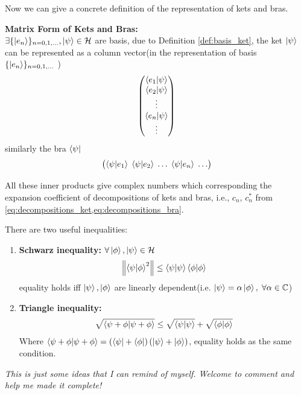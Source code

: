 Now we can give a concrete definition of the representation of kets and bras.
\begin{definition}{\textbf{Matrix Form of Kets and Bras:}}\label{def:matrix_ketandbra}
    \\ 
    $\exists \{\ket{e_n} \}_{n=0,1,\dots},\ket{\psi} \in \mathcal{H} $ are basis, due to Definition \ref{def:basis_ket}, the ket $\ket{\psi}$ can be represented as a column vector(in the representation of basis $\{\ket{e_n}\}_{n=0,1,\dots}$ )
    \begin{eqnarray}
        \begin{pmatrix}
            \braket{e_1|\psi} \\
            \braket{e_2|\psi} \\
            \vdots \\
            \braket{e_n|\psi} \\
            \vdots
        \end{pmatrix}
    \end{eqnarray}
    similarly the bra $\bra{\psi}$
    \begin{eqnarray}
        \begin{pmatrix}
            \braket{\psi|e_1}\;\braket{\psi|e_2}\;\dots\;\braket{\psi|e_n}\;\dots
        \end{pmatrix} \label{eq:row_bra}
    \end{eqnarray}
\end{definition}
All these inner products give complex numbers which corresponding the expansion coefficient of decompositions of kets and bras, i.e., $c_n,\,c_n^*$ from \cref{eq:decompositions_ket,eq:decompositions_bra}.

There are two useful inequalities: 
\begin{tcolorbox}
    \begin{enumerate}
        \item \textbf{Schwarz inequality:} $\forall \ket{\phi},\ket{\psi} \in \mathcal{H}$
        \begin{eqnarray}
            \left\lVert \braket{\psi|\phi}^2 \right\rVert \leq \braket{\psi|\psi} \braket{\phi|\phi}
        \end{eqnarray}
        equality holds iff $\ket{\psi},\ket{\phi}$ are linearly dependent(i.e. $\ket{\psi} = \alpha \ket{\phi},\; \forall \alpha \in \mathbb{C}$)
        \item \textbf{Triangle inequality:} 
         \begin{eqnarray}
            \sqrt{\braket{\psi + \phi| \psi+ \phi }} \leq \sqrt{\braket{\psi|\psi}} + \sqrt{\braket{\phi|\phi}}    
        \end{eqnarray}
        Where $\braket{\psi + \phi| \psi+ \phi } = \left( \bra{\psi}+ \bra{\phi}\right)\left(\ket{\psi}+\ket{\phi}\right)$, equality holds as the same condition. 
    \end{enumerate}
\end{tcolorbox}
\emph{This is just some ideas that I can remind of myself. Welcome to comment and help me made it complete!}

